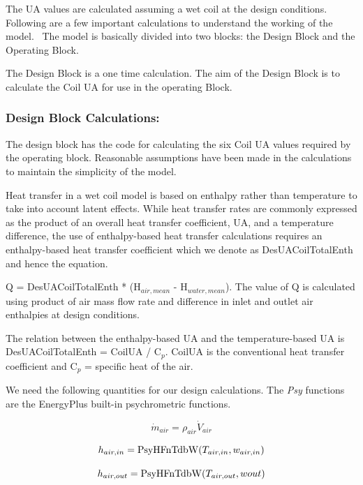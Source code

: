 The UA values are calculated assuming a wet coil at the design conditions. Following are a few important calculations to understand the working of the model.~ The model is basically divided into two blocks: the Design Block and the Operating Block.

The Design Block is a one time calculation. The aim of the Design Block is to calculate the Coil UA for use in the operating Block.

\subsubsection{Design Block Calculations:}\label{design-block-calculations}

The design block has the code for calculating the six Coil UA values required by the operating block. Reasonable assumptions have been made in the calculations to maintain the simplicity of the model.

Heat transfer in a wet coil model is based on enthalpy rather than temperature to take into account latent effects. While heat transfer rates are commonly expressed as the product of an overall heat transfer coefficient, UA, and a temperature difference, the use of enthalpy-based heat transfer calculations requires an enthalpy-based heat transfer coefficient which we denote as DesUACoilTotalEnth and hence the equation.

Q = DesUACoilTotalEnth * (H\(_{air,mean}\) - H\(_{water,mean}\)). The value of Q is calculated using product of air mass flow rate and difference in inlet and outlet air enthalpies at design conditions.

The relation between the enthalpy-based UA and the temperature-based UA is DesUACoilTotalEnth = CoilUA / C\(_{p}\). CoilUA is the conventional heat transfer coefficient and C\(_{p}\) = specific heat of the air.

We need the following quantities for our design calculations. The \emph{Psy} functions are the EnergyPlus built-in psychrometric functions.

\begin{equation}
{\dot m_{air}} = {\rho_{air}}{\dot V_{air}}
\end{equation}

\begin{equation}
{h_{air,in}} = {\mathop{\rm PsyHFnTdbW}\nolimits} ({T_{air,in}},{w_{air,in}})
\end{equation}

\begin{equation}
{h_{air,out}} = {\mathop{\rm PsyHFnTdbW}\nolimits} ({T_{air,out}},wout)
\end{equation}

